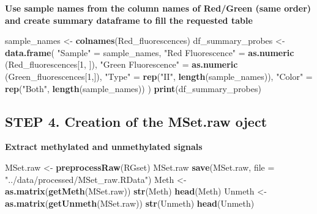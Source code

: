 \documentclass[
  11pt,
]{article}
\newenvironment{Shaded}{\begin{snugshade}}{\end{snugshade}}
\newcommand{\AttributeTok}[1]{\textcolor[rgb]{0.13,0.29,0.53}{#1}}
\newcommand{\DecValTok}[1]{\textcolor[rgb]{0.00,0.00,0.81}{#1}}
\newcommand{\FunctionTok}[1]{\textcolor[rgb]{0.13,0.29,0.53}{\textbf{#1}}}
\newcommand{\NormalTok}[1]{#1}
\newcommand{\OtherTok}[1]{\textcolor[rgb]{0.56,0.35,0.01}{#1}}
\newcommand{\StringTok}[1]{\textcolor[rgb]{0.31,0.60,0.02}{#1}}
\begin{document}
\textbf{Use sample names from the column names of Red/Green (same order)
and create summary dataframe to fill the requested table}

\begin{Shaded}
\begin{Highlighting}[]
\NormalTok{sample\_names }\OtherTok{\textless{}{-}} \FunctionTok{colnames}\NormalTok{(Red\_fluorescences)}
\NormalTok{df\_summary\_probes }\OtherTok{\textless{}{-}} \FunctionTok{data.frame}\NormalTok{(}
  \StringTok{"Sample"} \OtherTok{=}\NormalTok{ sample\_names,}
  \StringTok{"Red Fluorescence"} \OtherTok{=} \FunctionTok{as.numeric}\NormalTok{ (Red\_fluorescences[}\DecValTok{1}\NormalTok{, ]),}
  \StringTok{"Green Fluorescence"} \OtherTok{=} \FunctionTok{as.numeric}\NormalTok{ (Green\_fluorescences[}\DecValTok{1}\NormalTok{,]),}
  \StringTok{"Type"} \OtherTok{=} \FunctionTok{rep}\NormalTok{(}\StringTok{"II"}\NormalTok{, }\FunctionTok{length}\NormalTok{(sample\_names)),}
  \StringTok{"Color"} \OtherTok{=} \FunctionTok{rep}\NormalTok{(}\StringTok{"Both"}\NormalTok{, }\FunctionTok{length}\NormalTok{(sample\_names))}
\NormalTok{)}
\FunctionTok{print}\NormalTok{(df\_summary\_probes)}
\end{Highlighting}
\end{Shaded}

\subsection{STEP 4. Creation of the MSet.raw
oject}\label{step-4.-creation-of-the-mset.raw-oject}

\textbf{Extract methylated and unmethylated signals}

\begin{Shaded}
\begin{Highlighting}[]
\NormalTok{MSet.raw }\OtherTok{\textless{}{-}} \FunctionTok{preprocessRaw}\NormalTok{(RGset)}
\NormalTok{MSet.raw}
\FunctionTok{save}\NormalTok{(MSet.raw, }\AttributeTok{file =} \StringTok{"../data/processed/MSet\_raw.RData"}\NormalTok{)}
\NormalTok{Meth }\OtherTok{\textless{}{-}} \FunctionTok{as.matrix}\NormalTok{(}\FunctionTok{getMeth}\NormalTok{(MSet.raw))}
\FunctionTok{str}\NormalTok{(Meth)}
\FunctionTok{head}\NormalTok{(Meth)}
\NormalTok{Unmeth }\OtherTok{\textless{}{-}} \FunctionTok{as.matrix}\NormalTok{(}\FunctionTok{getUnmeth}\NormalTok{(MSet.raw))}
\FunctionTok{str}\NormalTok{(Unmeth)}
\FunctionTok{head}\NormalTok{(Unmeth)}
\end{Highlighting}
\end{Shaded}
\end{document}
